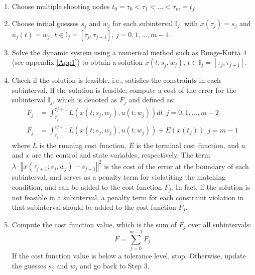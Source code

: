 \documentclass  [
  paper    = a4,
  BCOR     = 10mm,
  twoside,
  fontsize = 12pt,
  fleqn,
  toc      = bibnumbered,
  toc      = listofnumbered,
  numbers  = noendperiod,
  headings = normal,
  listof   = leveldown,
  version  = 3.03
]                                       {scrreprt}
\newcommand{\<}{\langle}
\renewcommand{\>}{\rangle}
\begin{document}
\begin{enumerate}
	\item Choose multiple shooting nodes $t_0 = \tau_0 < \tau_1 < \dots < \tau_m = t_f$.
	\item Choose initial guesses $s_j$ and $w_j$ for each subinterval $\mathbb{I}_j$, with $x(\tau_j) = s_j$ and $u_j(t) = w_j$, $t \in \mathbb{I}_j = [\tau_j,\tau_{j+1}]$, $j=0,1,\dots,m-1$.
	\item Solve the dynamic system using a numerical method such as Runge-Kutta 4 (see appendix \ref{App1}) to obtain a solution $x(t; s_j, w_j)$, $t\in\mathbb{I}_j = [\tau_j, \tau_{j+1}]$.
	\item Check if the solution is feasible, i.e., satisfies the constraints in each subinterval. If the solution is feasible, compute a cost of the error for the subinterval $\mathbb{I}_j$, which is denoted as $F_j$ and defined as:
	\begin{equation}\label{eq_PW_obj}
		\begin{aligned}
			F_j &= \int_{\tau_j}^{\tau{j+1}} L(x(t;s_j,w_j), u(t;w_j)) dt   \ \    j= 0, 1, ..., m-2 \\ 
			F_j  & = \int_{\tau_j}^{\tau{j+1}} L(x(t;s_j,w_j), u(t;w_j)) +  E (x(t_f))  \ \  j =m-1 
		\end{aligned}
	\end{equation}
	where $L$ is the running cost function, $E$ is the terminal cost function, and $u$ and $x$ are the control and state variables, respectively. The term $\lambda \cdot \left\Vert x(\tau_{j+1};s_j,w_j)-s_{j+1}\right\Vert^2$ is the cost of the error at the boundary of each subinterval, and serves as a penalty term for violatiting the matching condition, and can be added to the cost function $F_j$. In fact, if the solution is not feasible in a subinterval,  a penalty term for each constraint violation in that subinterval should be added to the cost function $F_j$.
	\item Compute the cost function value, which is the sum of $F_j$ over all subintervals:
	$$F = \sum_{j=0}^{m-1} F_j$$
	If the cost function value is below a tolerance level, stop. Otherwise, update the guesses $s_j$ and $w_j$ and go back to Step 3.
\end{enumerate}
\end{document}
